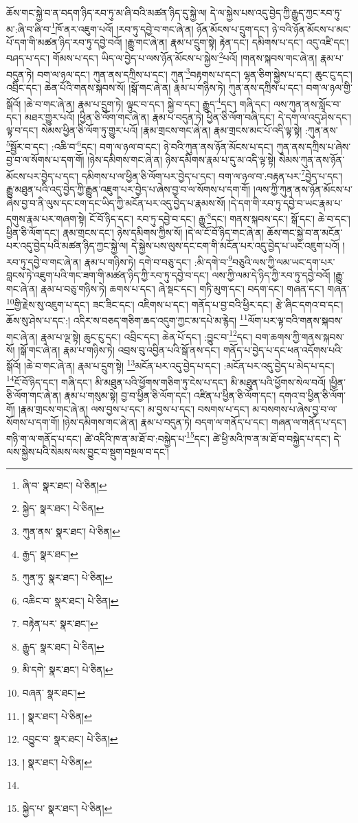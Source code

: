 ཆོས་གང་སྐྱེ་བ་ན་བདག་ཉིད་རབ་ཏུ་མ་ཞི་བའི་མཚན་ཉིད་དུ་སྐྱེ་ལ། དེ་ལ་སྐྱེས་པས་འདུ་བྱེད་ཀྱི་རྒྱུད་ཀྱང་རབ་ཏུ་མ་:ཞི་བ་ཞི་བ་\footnote{ཞི་བ་  སྣར་ཐང་།  པེ་ཅིན། }ཁོ་ནར་འཇུག་པའོ། །རབ་ཏུ་དབྱེ་བ་གང་ཞེ་ན། ཉོན་མོངས་པ་དྲུག་དང་། ཉེ་བའི་ཉོན་མོངས་པ་མང་པོ་དག་གི་མཚན་ཉིད་རབ་ཏུ་དབྱེ་བའོ། །རྒྱུ་གང་ཞེ་ན། རྣམ་པ་དྲུག་སྟེ། རྟེན་དང་། དམིགས་པ་དང་། འདུ་འཛི་དང་། བཤད་པ་དང་། གོམས་པ་དང་། ཡིད་ལ་བྱེད་པ་ལས་ཉོན་མོངས་པ་སྐྱེས་\footnote{སྐྱེད་  སྣར་ཐང་།  པེ་ཅིན། }པའོ། །གནས་སྐབས་གང་ཞེ་ན། རྣམ་པ་བདུན་ཏེ། བག་ལ་ཉལ་དང་། ཀུན་ནས་དཀྲིས་པ་དང་། ཀུན་\footnote{ཀུན་ནས་  སྣར་ཐང་།  པེ་ཅིན། }བརྟགས་པ་དང་། ལྷན་ཅིག་སྐྱེས་པ་དང་། ཆུང་ངུ་དང་། འབྲིང་དང་། ཆེན་པོའི་གནས་སྐབས་སོ། །སྒོ་གང་ཞེ་ན། རྣམ་པ་གཉིས་ཏེ། ཀུན་ནས་དཀྲིས་པ་དང་། བག་ལ་ཉལ་གྱི་སྒོའོ། །ཆེ་བ་གང་ཞེ་ན། རྣམ་པ་དྲུག་ཏེ། ལྟུང་བ་དང་། སྐྱེ་བ་དང་། རྒྱུད་\footnote{རྒྱད་  སྣར་ཐང་། }དང་། གཞི་དང་། ལས་ཀུན་ནས་སློང་བ་དང་། མཐར་གྱུར་པའོ། །ཕྱིན་ཅི་ལོག་གང་ཞེ་ན། རྣམ་པ་བདུན་ཏེ། ཕྱིན་ཅི་ལོག་བཞི་དང་། དེ་དག་ལ་འདུ་ཤེས་དང་། ལྟ་བ་དང་། སེམས་ཕྱིན་ཅི་ལོག་ཏུ་གྱུར་པའོ། །རྣམ་གྲངས་གང་ཞེ་ན། རྣམ་གྲངས་མང་པོ་འདི་ལྟ་སྟེ། :ཀུན་ནས་\footnote{ཀུན་ཏུ་  སྣར་ཐང་།  པེ་ཅིན། }སྦྱོར་བ་དང་། :འཆི་བ་\footnote{འཆིང་བ་  སྣར་ཐང་།  པེ་ཅིན། }དང་། བག་ལ་ཉལ་བ་དང་། ཉེ་བའི་ཀུན་ནས་ཉོན་མོངས་པ་དང་། ཀུན་ནས་དཀྲིས་པ་ཞེས་བྱ་བ་ལ་སོགས་པ་དག་གོ། །ཉེས་དམིགས་གང་ཞེ་ན། ཉེས་དམིགས་རྣམ་པ་དུ་མ་འདི་ལྟ་སྟེ། སེམས་ཀུན་ནས་ཉོན་མོངས་པར་བྱེད་པ་དང་། དམིགས་པ་ལ་ཕྱིན་ཅི་ལོག་པར་བྱེད་པ་དང་། བག་ལ་ཉལ་བ་:བརྟན་པར་\footnote{བརྟེན་པར་  སྣར་ཐང་། }བྱེད་པ་དང་། རྒྱུ་མཐུན་པའི་འདུ་བྱེད་ཀྱི་རྒྱུན་འཇུག་པར་བྱེད་པ་ཞེས་བྱ་བ་ལ་སོགས་པ་དག་གོ། །ལས་ཀྱི་ཀུན་ནས་ཉོན་མོངས་པ་ཞེས་བྱ་བ་ནི་ལུས་དང་ངག་དང་ཡིད་ཀྱི་མངོན་པར་འདུ་བྱེད་པ་རྣམས་སོ། །དེ་དག་གི་རབ་ཏུ་དབྱེ་བ་ཡང་རྣམ་པ་དགུས་རྣམ་པར་གཞག་སྟེ། ངོ་བོ་ཉིད་དང་། རབ་ཏུ་དབྱེ་བ་དང་། རྒྱུ་\footnote{རྒྱུད་  སྣར་ཐང་།  པེ་ཅིན། }དང་། གནས་སྐབས་དང་། སྒོ་དང་། ཆེ་བ་དང་། ཕྱིན་ཅི་ལོག་དང་། རྣམ་གྲངས་དང་། ཉེས་དམིགས་ཀྱིས་སོ། །དེ་ལ་ངོ་བོ་ཉིད་གང་ཞེ་ན། ཆོས་གང་སྐྱེ་བ་ན་མངོན་པར་འདུ་བྱེད་པའི་མཚན་ཉིད་ཀྱང་སྐྱེ་ལ། དེ་སྐྱེས་པས་ལུས་དང་ངག་གི་མངོན་པར་འདུ་བྱེད་པ་ཡང་འཇུག་པའོ། །རབ་ཏུ་དབྱེ་བ་གང་ཞེ་ན། རྣམ་པ་གཉིས་ཏེ། དགེ་བ་བཅུ་དང་། :མི་དགེ་བ་\footnote{མི་དགེ་  སྣར་ཐང་།  པེ་ཅིན། }བཅུའི་ལས་ཀྱི་ལམ་ཡང་དག་པར་བླངས་ཏེ་འཇུག་པའི་གང་ཟག་གི་མཚན་ཉིད་ཀྱི་རབ་ཏུ་དབྱེ་བ་དང་། ལས་ཀྱི་ལམ་དེ་ཉིད་ཀྱི་རབ་ཏུ་དབྱེ་བའོ། །རྒྱུ་གང་ཞེ་ན། རྣམ་པ་བཅུ་གཉིས་ཏེ། ཆགས་པ་དང་། ཞེ་སྡང་དང་། གཏི་མུག་དང་། བདག་དང་། གཞན་དང་། གཞན་\footnote{བཞན་  སྣར་ཐང་། }གྱི་རྗེས་སུ་འཇུག་པ་དང་། ཟང་ཟིང་དང་། འཇིགས་པ་དང་། གནོད་པ་བྱ་བའི་ཕྱིར་དང་། རྩེ་ཞིང་དགའ་བ་དང་། ཆོས་སུ་ཤེས་པ་དང་:། འདིར་ས་བཅད་གཅིག་ཆད་འདུག་ཀྱང་མ་དཔེ་མ་རྙེད། \footnote{།    སྣར་ཐང་།  པེ་ཅིན། }ལོག་པར་ལྟ་བའི་གནས་སྐབས་གང་ཞེ་ན། རྣམ་པ་ལྔ་སྟེ། ཆུང་ངུ་དང་། འབྲིང་དང་། ཆེན་པོ་དང་། :བྱུང་བ་\footnote{འབྱུང་བ་  སྣར་ཐང་།  པེ་ཅིན། }དང་། བག་ཆགས་ཀྱི་གནས་སྐབས་སོ། །སྒོ་གང་ཞེ་ན། རྣམ་པ་གཉིས་ཏེ། འབྲས་བུ་འབྱིན་པའི་སྒོ་ནས་དང་། གནོད་པ་བྱེད་པ་དང་ཕན་འདོགས་པའི་སྒོའོ། །ཆེ་བ་གང་ཞེ་ན། རྣམ་པ་དྲུག་སྟེ། \footnote{།    སྣར་ཐང་།  པེ་ཅིན། }མངོན་པར་འདུ་བྱེད་པ་དང་། :མངོན་པར་འདུ་བྱེད་པ་མེད་པ་དང་། \footnote{}ངོ་བོ་ཉིད་དང་། གཞི་དང་། མི་མཐུན་པའི་ཕྱོགས་གཅིག་ཏུ་ངེས་པ་དང་། མི་མཐུན་པའི་ཕྱོགས་སེལ་བའོ། །ཕྱིན་ཅི་ལོག་གང་ཞེ་ན། རྣམ་པ་གསུམ་སྟེ། བྱ་བ་ཕྱིན་ཅི་ལོག་དང་། འཛིན་པ་ཕྱིན་ཅི་ལོག་དང་། དགའ་བ་ཕྱིན་ཅི་ལོག་གོ། །རྣམ་གྲངས་གང་ཞེ་ན། ལས་བྱས་པ་དང་། མ་བྱས་པ་དང་། བསགས་པ་དང་། མ་བསགས་པ་ཞེས་བྱ་བ་ལ་སོགས་པ་དག་གོ། །ཉེས་དམིགས་གང་ཞེ་ན། རྣམ་པ་བདུན་ཏེ། བདག་ལ་གནོད་པ་དང་། གཞན་ལ་གནོད་པ་དང་། གཉི་ག་ལ་གནོད་པ་དང་། ཚེ་འདིའི་ཁ་ན་མ་ཐོ་བ་:བསྐྱེད་པ་\footnote{སྐྱེད་པ་  སྣར་ཐང་།  པེ་ཅིན། }དང་། ཚེ་ཕྱི་མའི་ཁ་ན་མ་ཐོ་བ་བསྐྱེད་པ་དང་། དེ་ལས་སྐྱེས་པའི་སེམས་ལས་བྱུང་བ་སྡུག་བསྔལ་བ་དང་། 
